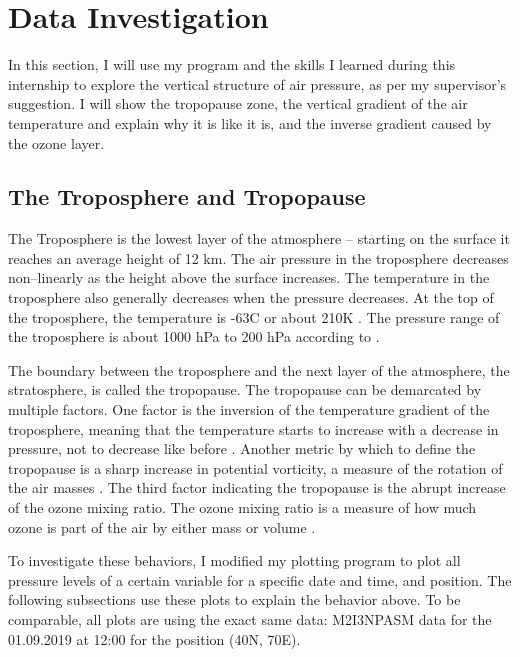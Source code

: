 \documentclass[../00_main.tex]{subfiles}
\begin{document}
\section{Data Investigation}

In this section, I will use my program and the skills I learned during this
internship to explore the vertical structure of air pressure, as per my
supervisor's suggestion. I will show the tropopause zone, the vertical gradient
of the air temperature and explain why it is like it is, and the inverse
gradient caused by the ozone layer.

\subsection{The Troposphere and Tropopause}

The Troposphere is the lowest layer of the atmosphere -- starting on the 
surface it reaches an average height of 12 km. The air pressure in the 
troposphere decreases non--linearly as the height above the surface increases.
The temperature in the troposphere also generally decreases when the pressure
decreases. At the top of the troposphere, the temperature is -63\textdegree{}C
or about 210K \cite{tropopause}. The pressure range of the troposphere is about 
1000 hPa to 200 hPa according to \cite{pressure}.\newline

The boundary between the troposphere and the next layer of the atmosphere,
the stratosphere, is called the tropopause. The tropopause can be demarcated
by multiple factors. One factor is the inversion of the temperature gradient of
the troposphere, meaning that the temperature starts to increase with
a decrease in pressure, not to decrease like before \cite{tropopause}.
Another metric by which to define the tropopause is a sharp increase in
potential vorticity, a measure of the rotation of the air masses 
\cite{tropopause}. The third factor indicating the tropopause is the abrupt 
increase of the ozone mixing ratio. The ozone mixing ratio is a measure of how 
much ozone is part of the air by either mass or volume 
\cite{atmosphere}.\newline

To investigate these behaviors, I modified my plotting program to plot all
pressure levels of a certain variable for a specific date and time, and
position. The following subsections use these plots to explain the behavior
above. To be comparable, all plots are using the exact same data: M2I3NPASM
data for the 01.09.2019 at 12:00 for the position (40\textdegree{}N,
70\textdegree{}E).
\end{document}
